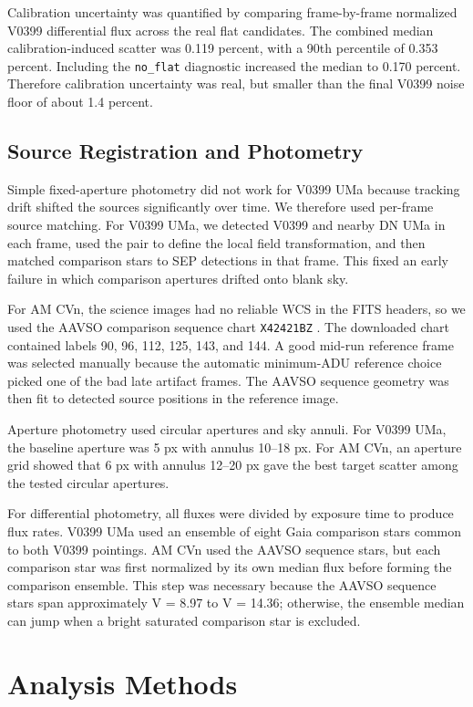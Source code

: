 \documentclass[11pt]{article}
\begin{document}
Calibration uncertainty was quantified by comparing frame-by-frame normalized
V0399 differential flux across the real flat candidates. The combined median
calibration-induced scatter was 0.119 percent, with a 90th percentile of
0.353 percent. Including the \texttt{no\_flat} diagnostic increased the median
to 0.170 percent. Therefore calibration uncertainty was real, but smaller than
the final V0399 noise floor of about 1.4 percent.

\subsection{Source Registration and Photometry}

Simple fixed-aperture photometry did not work for V0399 UMa because tracking
drift shifted the sources significantly over time. We therefore used per-frame
source matching. For V0399 UMa, we detected V0399 and nearby DN UMa in each
frame, used the pair to define the local field transformation, and then matched
comparison stars to SEP detections in that frame. This fixed an early failure in
which comparison apertures drifted onto blank sky.

For AM CVn, the science images had no reliable WCS in the FITS headers, so we
used the AAVSO comparison sequence chart \texttt{X42421BZ} \cite{aavsoCharts}.
The downloaded chart contained labels 90, 96, 112, 125, 143, and 144. A good
mid-run reference frame was selected manually because the automatic minimum-ADU
reference choice picked one of the bad late artifact frames. The AAVSO sequence
geometry was then fit to detected source positions in the reference image.

Aperture photometry used circular apertures and sky annuli. For V0399 UMa, the
baseline aperture was 5 px with annulus 10--18 px. For AM CVn, an aperture grid
showed that 6 px with annulus 12--20 px gave the best target scatter among the
tested circular apertures.

For differential photometry, all fluxes were divided by exposure time to produce
flux rates. V0399 UMa used an ensemble of eight Gaia comparison stars common to
both V0399 pointings. AM CVn used the AAVSO sequence stars, but each comparison
star was first normalized by its own median flux before forming the comparison
ensemble. This step was necessary because the AAVSO sequence stars span
approximately V = 8.97 to V = 14.36; otherwise, the ensemble median can jump
when a bright saturated comparison star is excluded.

\section{Analysis Methods}
\end{document}

